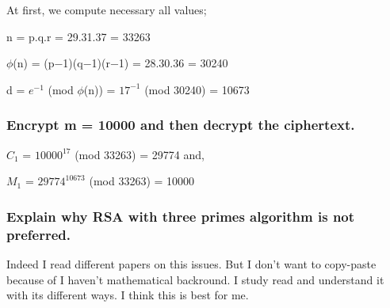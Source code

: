 \documentclass[11pt]{article}
\begin{document}
At first, we compute necessary all values;\\

\begin{center}
n = p.q.r = 29.31.37 = 33263\\
\end{center}
    
\begin{center}
$\phi $(n) = (p−1)(q−1)(r−1) = 28.30.36 = 30240\\
\end{center}
\begin{center}
    d = $e^{-1}$ (mod $\phi$(n)) = $17^{-1}$ (mod 30240) = 10673\\

\end{center}


\subsubsection{\textbf{Encrypt m = 10000 and then decrypt the ciphertext.}}


\begin{center}
    $C_{1}$ = $10000^{17}$ (mod 33263) = 29774 and,
\end{center}

\begin{center}
    $M_{1}$ = $29774^{10673}$ (mod 33263) = 10000
 
\end{center}


\subsubsection{\textbf{Explain why RSA with three primes algorithm is not preferred.}}

Indeed I read different  papers on this issues. But I don't want to copy-paste because of I haven't 
mathematical backround. I study read and understand it with its different ways. I think this is best for me.
\end{document}
